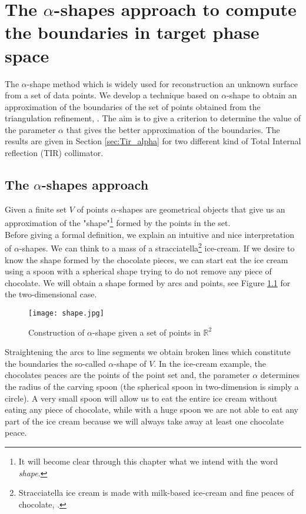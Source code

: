 \chapter{The $\alpha$-shapes approach to compute the boundaries in target phase space}\label{chap:boundaries_alpha}
The $\alpha$-shape method which is widely used for reconstruction an unknown surface from a set of data points.
We develop a technique based on $\alpha$-shape to obtain an approximation of the boundaries of the set of points obtained from the triangulation refinement, \cite{guo1997surface}.
The aim is to give a criterion to determine the value of the parameter $\alpha$ that gives the better approximation of the boundaries.
The results are given in Section \ref{sec:Tir_alpha} for two different kind of Total Internal reflection (TIR) collimator.
\section{The $\alpha$-shapes approach}
Given a finite set $V$ of points $\alpha$-shapes are geometrical objects that give us an approximation of the "shape"\footnote{It will become clear through this chapter what we intend with the word \textit{shape}.} formed by the points in the set.\\ \indent
Before giving a formal definition, we explain an intuitive and nice interpretation of $\alpha$-shapes. 
We can think to a mass of a stracciatella\footnote{Stracciatella ice cream is made with milk-based ice-cream and fine peaces of chocolate, \cite{Wiki3}.} ice-cream. If we desire to know the shape formed by the chocolate pieces, we can start eat the ice cream using a spoon with a spherical shape trying to do not remove any piece of chocolate. 
We will obtain a shape formed by arcs and points, see Figure \ref{fig:shape2d} for the two-dimensional case.
\begin{figure}[htbp]\label{fig:shape2d}
\begin{center}
\texttt{[image: shape.jpg]}
\label{fig:shape}
\caption{Construction of $\alpha$-shape given a set of points in $\mathbb{R}^2$}
\label{fig:shape2d}
\end{center}
\end{figure}
Straightening the arcs to line segments we obtain broken lines which constitute the boundaries the so-called $\alpha$-shape of $V$. In the ice-cream example, the chocolates peaces are the points of the point set and, the parameter $\alpha$ determines the radius of the carving spoon (the spherical spoon in two-dimension is simply a circle). A very small spoon will allow us to eat the entire ice cream without eating any piece of chocolate, while with a huge spoon we are not able to eat any part of the ice cream because we will always take away at least one chocolate peace.\\ \indent 
